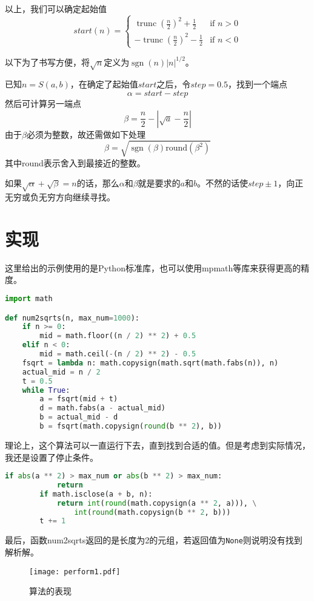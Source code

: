 \documentclass[a4paper, UTF8]{ctexart}
\DeclareMathOperator{\sgn}{\mathrm{sgn}}
\DeclareMathOperator{\trunc}{\mathrm{trunc}}
\begin{document}
以上，我们可以确定起始值
\[
    start(n)=
    \begin{cases}
        \trunc(\frac{n}{2})^2+\frac{1}{2} & \text{if }n>0 \\
        -\trunc(\frac{n}{2})^2-\frac{1}{2} & \text{if }n<0
    \end{cases}
\]

以下为了书写方便，将$\sqrt{n}$定义为$\sgn(n)|n|^{1/2}$。

已知$n=S(a,b)$，在确定了起始值$start$之后，令$step=0.5$，找到一个端点\[\alpha=start-step\]然后可计算另一端点\[\beta=\frac{n}{2}-|\sqrt{a}-\frac{n}{2}|\]由于$\beta$必须为整数，故还需做如下处理\[\beta=\sqrt{\sgn(\beta)\mathrm{round}(\beta^2)}\]其中round表示舍入到最接近的整数。

如果$\sqrt{\alpha}+\sqrt{\beta}=n$的话，那么$\alpha$和$\beta$就是要求的$a$和$b$。不然的话使$step\pm1$，向正无穷或负无穷方向继续寻找。

\section{实现}
这里给出的示例使用的是Python标准库，也可以使用mpmath等库来获得更高的精度。

\begin{lstlisting}[language=python, name=example1]
import math

def num2sqrts(n, max_num=1000):
	if n >= 0:
        mid = math.floor((n / 2) ** 2) + 0.5
    elif n < 0:
        mid = math.ceil(-(n / 2) ** 2) - 0.5
    fsqrt = lambda n: math.copysign(math.sqrt(math.fabs(n)), n)
    actual_mid = n / 2
    t = 0.5
    while True:
        a = fsqrt(mid + t)
        d = math.fabs(a - actual_mid)
        b = actual_mid - d
        b = fsqrt(math.copysign(round(b ** 2), b))
\end{lstlisting}
理论上，这个算法可以一直运行下去，直到找到合适的值。但是考虑到实际情况，我还是设置了停止条件。
\begin{lstlisting}[language=python, name=example1]
        if abs(a ** 2) > max_num or abs(b ** 2) > max_num:
            return
        if math.isclose(a + b, n):
            return int(round(math.copysign(a ** 2, a))), \
                int(round(math.copysign(b ** 2, b)))
        t += 1
\end{lstlisting}
最后，函数num2sqrts返回的是长度为2的元组，若返回值为\verb|None|则说明没有找到解析解。

\begin{figure}[htb]
	\centering
	\texttt{[image: perform1.pdf]}
	\caption{算法的表现}
	\label{fig:perform1}
\end{figure}
\end{document}
